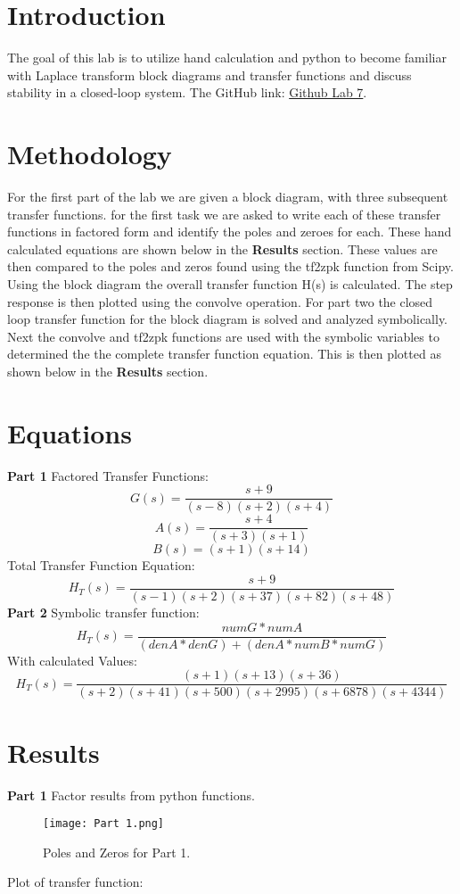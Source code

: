 \documentclass[12pt]{report}
\begin{document}
\section{Introduction}
    The goal of this lab is to utilize hand calculation and python to become familiar with Laplace transform block diagrams and transfer functions and discuss stability in a
closed-loop system.
\newline \newline The GitHub link: \href{https://github.com/CDJohnson279}{Github Lab 7}. 

\section{Methodology}
For the first part of the lab we are given a block diagram, with three subsequent transfer functions. for the first task we are asked to write each of these transfer functions in factored form and identify the poles and zeroes for each. These hand calculated equations are shown below in the \textbf{Results} section. These values are then compared to the poles and zeros found using the tf2zpk function from Scipy. Using the block diagram the overall transfer function H(s) is calculated. The step response is then plotted using the convolve operation.
For part two the closed loop transfer function for the block diagram is solved and analyzed symbolically. Next the convolve and tf2zpk functions are used with the symbolic variables to determined the the complete transfer function equation. This is then plotted as shown below in the \textbf{Results} section.


\section{Equations}
\textbf{Part 1}
Factored Transfer Functions:
$$ G(s) = \frac{s+9}{(s-8)(s+2)(s+4)} $$
$$ A(s) = \frac{s+4}{(s+3)(s+1)} $$\newline
$$ B(s) = (s+1)(s+14)$$
Total Transfer Function Equation:
$$H_T(s) = \frac{s+9}{(s-1)(s+2)(s+37)(s+82)(s+48)}$$
\newpage
\textbf{Part 2}
\newline 
Symbolic transfer function:
$$H_T(s) = \frac{numG*numA}{(denA*denG)+(denA*numB*numG)}$$
\newline
With calculated Values:
$$H_T(s) = \frac{(s+1)(s+13)(s+36)}{(s+2)(s+41)(s+500)(s+2995)(s+6878)(s+4344)}$$

\newpage
\section{Results}
\textbf{Part 1}\newline
Factor results from python functions.
\begin{figure}[htp]
    \centering
    \texttt{[image: Part 1.png]}
    \caption{Poles and Zeros for Part 1.}
    \label{fig:Part 1.png}
\end{figure}\newline
Plot of transfer function:
\end{document}

